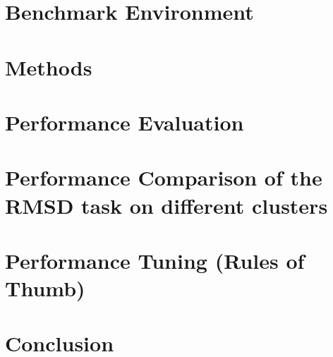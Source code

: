 \documentclass[review]{elsarticle}
\begin{document}
\section{Benchmark Environment}


\section{Methods}


\section{Performance Evaluation}


\section{Performance Comparison of the RMSD task on different clusters}


\section{Performance Tuning (Rules of Thumb)}


\section{Conclusion}

\end{document}
